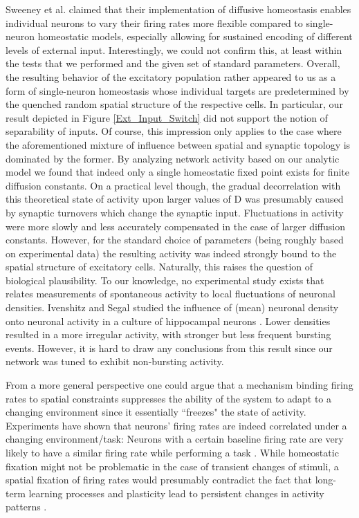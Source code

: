 \documentclass[10pt,a4paper]{article}
\begin{document}
Sweeney et al. claimed that their implementation of diffusive homeostasis enables individual neurons to vary their firing rates more flexible compared to single-neuron homeostatic models, especially allowing for sustained encoding of different levels of external input. Interestingly, we could not confirm this, at least within the tests that we performed and the given set of standard parameters. Overall, the resulting behavior of the excitatory population rather appeared to us as a form of single-neuron homeostasis whose individual targets are predetermined by the quenched random spatial structure of the respective cells. In particular, our result depicted in Figure \ref{Ext_Input_Switch} did not support the notion of separability of inputs. Of course, this impression only applies to the case where the aforementioned mixture of influence between spatial and synaptic topology is dominated by the former. By analyzing network activity based on our analytic model we found that indeed only a single homeostatic fixed point exists for finite diffusion constants. On a practical level though, the gradual decorrelation with this theoretical state of activity upon larger values of $\mathrm{D}$ was presumably caused by synaptic turnovers which change the synaptic input. Fluctuations in activity were more slowly and less accurately compensated in the case of larger diffusion constants. However, for the standard choice of parameters (being roughly based on experimental data) the resulting activity was indeed strongly bound to the spatial structure of excitatory cells. Naturally, this raises the question of biological plausibility. To our knowledge, no experimental study exists that relates measurements of spontaneous activity to local fluctuations of neuronal densities. Ivenshitz and Segal studied the influence of (mean) neuronal density onto neuronal activity in a culture of hippocampal neurons \cite{Ivenshitz_2010}. Lower densities resulted in a more irregular activity, with stronger but less frequent bursting events. However, it is hard to draw any conclusions from this result since our network was tuned to exhibit non-bursting activity.

From a more general perspective one could argue that a mechanism binding firing rates to spatial constraints suppresses the ability of the system to adapt to a changing environment since it essentially ``freezes" the state of activity. Experiments have shown that neurons' firing rates are indeed correlated under a changing environment/task: Neurons with a certain baseline firing rate are very likely to have a similar firing rate while performing a task \cite{Buzsaki_Fir_Rates_2014}. While homeostatic fixation might not be problematic in the case of transient changes of stimuli, a spatial fixation of firing rates would presumably contradict the fact that long-term learning processes and plasticity lead to persistent changes in activity patterns \cite{Lever_Long_Term_Plast_2002}.
\end{document}
